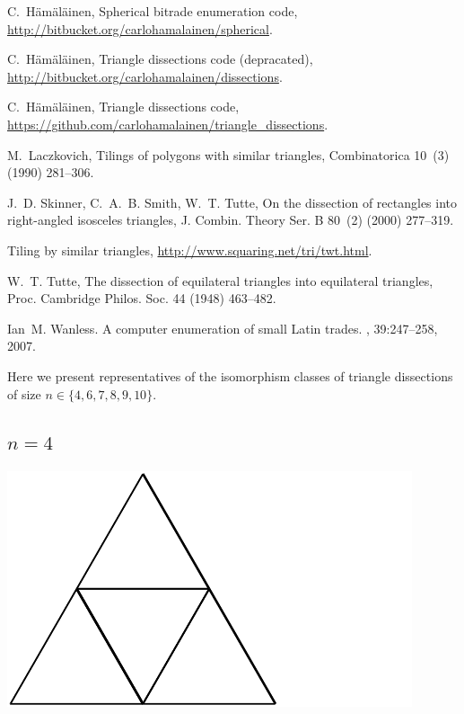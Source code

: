 \documentclass[12pt,amstags,fleqn]{article}
\theoremstyle{plain}
\theoremstyle{definition}
\begin{document}
\begin{thebibliography}{10}
C.~H\"{a}m\"{a}l\"{a}inen, Spherical bitrade enumeration code,
  \url{http://bitbucket.org/carlohamalainen/spherical}.

C.~H\"{a}m\"{a}l\"{a}inen,
Triangle dissections code (depracated),
  \url{http://bitbucket.org/carlohamalainen/dissections}.

C.~H\"{a}m\"{a}l\"{a}inen,
Triangle dissections code,
  \url{https://github.com/carlohamalainen/triangle\_dissections}.

M.~Laczkovich, Tilings of polygons with similar triangles, Combinatorica 10~(3)
  (1990) 281--306.

J.~D. Skinner, C.~A.~B. Smith, W.~T. Tutte, On the dissection of rectangles
  into right-angled isosceles triangles, J. Combin. Theory Ser. B 80~(2) (2000)
  277--319.

Tiling by similar triangles, \url{http://www.squaring.net/tri/twt.html}.

W.~T. Tutte, The dissection of equilateral triangles into equilateral
  triangles, Proc. Cambridge Philos. Soc. 44 (1948) 463--482.

Ian~M. Wanless.
\newblock A computer enumeration of small {L}atin trades.
, 39:247--258, 2007.


\end{thebibliography}


Here we present representatives of the isomorphism classes of triangle
dissections of size $n \in \{4, 6, 7, 8, 9, 10 \}$.

%

\subsection*{$n = 4$}

\includegraphics{output-dissections-dissection4_i36_r3_c1.pdf}
\end{document}
